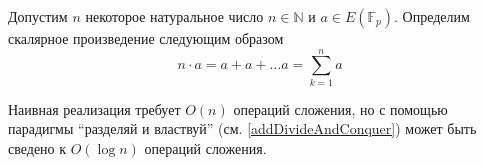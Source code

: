 Допустим $n$ некоторое натуральное число $n \in \mathbb{N}$ и $a \in
E\left(\mathbb{F}_p\right)$. Определим скалярное произведение
следующим образом
\[
n \cdot a = a + a + \dots a = \sum_{k=1}^n a
\] 

Наивная реализация требует $O\left(n\right)$ операций сложения, но с
помощью парадигмы ``разделяй и властвуй'' (см.
\autoref{addDivideAndConquer}) может быть сведено к $O\left(\log
n\right)$ операций сложения.



